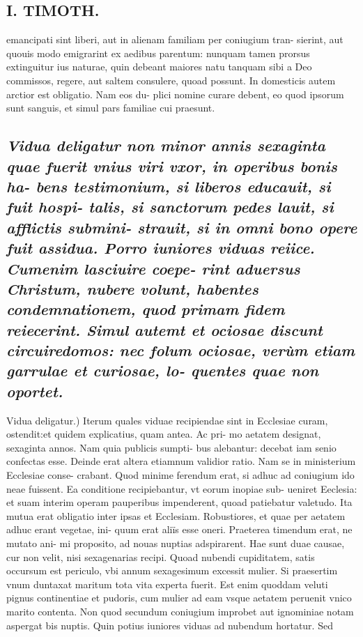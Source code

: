 \documentclass{article}
\begin{document}
\begin{pages}
\section*{I. TIMOTH. }
\marginpar{[ p.60 ]}\pstart emancipati sint liberi, aut in alienam familiam per coniugium tran- sierint, aut quouis modo emigrarint ex aedibus parentum: nunquam tamen prorsus extinguitur ius naturae, quin debeant maiores natu tanquam sibi a Deo commissos, regere, aut saltem consulere, quoad possunt. In domesticis autem arctior est obligatio. Nam eos du- plici nomine curare debent, eo quod ipsorum sunt sanguis, et simul pars familiae cui praesunt.  \pend
{}
{}
\subsection*{\textit{Vidua deligatur non minor annis sexaginta quae fuerit vnius viri vxor, in operibus bonis ha- bens testimonium, si liberos educauit, si fuit hospi- talis, si sanctorum pedes lauit, si afflictis submini- strauit, si in omni bono opere fuit assidua. Porro iuniores viduas reiice. Cumenim lasciuire coepe- rint aduersus Christum, nubere volunt, habentes condemnationem, quod primam fidem reiecerint. Simul autemt et ociosae discunt circuiredomos: nec folum ociosae, verùm etiam garrulae et curiosae, lo- quentes quae non oportet. }}\pstart Vidua deligatur.) Iterum quales viduae recipiendae sint in Ecclesiae curam, ostendit:et quidem explicatius, quam antea. Ac pri- mo aetatem designat, sexaginta annos. Nam quia publicis sumpti- bus alebantur: decebat iam senio confectas esse. Deinde erat altera etiamnum validior ratio. Nam se in ministerium Ecclesiae conse- crabant. Quod minime ferendum erat, si adhuc ad coniugium ido neae fuissent. Ea conditione recipiebantur, vt eorum inopiae sub- ueniret Eeclesia: et suam interim operam pauperibus impenderent, quoad patiebatur valetudo. Ita mutua erat obligatio inter ipsas et Ecclesiam. Robustiores, et quae per aetatem adhuc erant vegetae, ini- quum erat aliïs esse oneri. Praeterea timendum erat, ne mutato ani- mi proposito, ad nouas nuptias adspirarent. Hae sunt duae causae, cur non velit, nisi sexagenarias recipi. Quoad nubendi cupiditatem, satis occursum est periculo, vbi annum sexagesimum excessit mulier. Si praesertim vnum duntaxat maritum tota vita experta fuerit. Est enim quoddam veluti pignus continentiae et pudoris, cum mulier ad eam vsque aetatem peruenit vnico marito contenta. Non quod secundum coniugium improbet aut ignominiae notam aspergat bis nuptis. Quin potius iuniores viduas ad nubendum hortatur. Sed  \pend

\end{pages}
\end{document}
